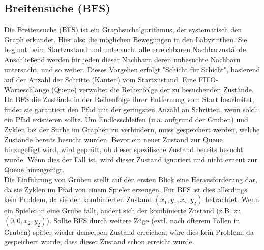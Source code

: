 \documentclass[a4paper,10pt,ngerman]{scrartcl}
\begin{document}
\subsection{Breitensuche (BFS)}
Die Breitensuche (BFS) ist ein Graphsuchalgorithmus, der systematisch den Graph erkundet. Hier also die möglichen Bewegungen in den Labyrinthen. Sie beginnt beim Startzustand und untersucht alle erreichbaren Nachbarzustände. Anschließend werden für jeden dieser Nachbarn deren unbesuchte Nachbarn untersucht, und so weiter. Dieses Vorgehen erfolgt "Schicht für Schicht", basierend auf der Anzahl der Schritte (Kanten) vom Startzustand. Eine FIFO-Warteschlange (Queue) verwaltet die Reihenfolge der zu besuchenden Zustände. Da BFS die Zustände in der Reihenfolge ihrer Entfernung vom Start bearbeitet, findet sie garantiert den Pfad mit der geringsten Anzahl an Schritten, wenn solch ein Pfad existieren sollte. Um Endlosschleifen (u.a. aufgrund der Gruben) und Zyklen bei der Suche im Graphen zu verhindern, muss gespeichert werden, welche Zustände bereits besucht wurden. Bevor ein neuer Zustand zur Queue hinzugefügt wird, wird geprüft, ob dieser spezifische Zustand bereits besucht wurde. Wenn dies der Fall ist, wird dieser Zustand ignoriert und nicht erneut zur Queue hinzugefügt. 
\\\indent \indent Die Einführung von Gruben stellt auf den ersten Blick eine Herausforderung dar, da sie Zyklen im Pfad von einem Spieler erzeugen. Für BFS ist dies allerdings kein Problem, da sie den kombinierten Zustand $(x_1, y_1, x_2, y_2)$ betrachtet. Wenn ein Spieler in eine Grube fällt, ändert sich der kombinierte Zustand (z.B. zu $(0, 0, x_2, y_2)$). Sollte BFS durch weitere Züge (evtl. nach öfterem Fallen in Gruben) später wieder denselben Zustand erreichen, wäre dies kein Problem, da gespeichert wurde, dass dieser Zustand schon erreicht wurde. 
\end{document}
